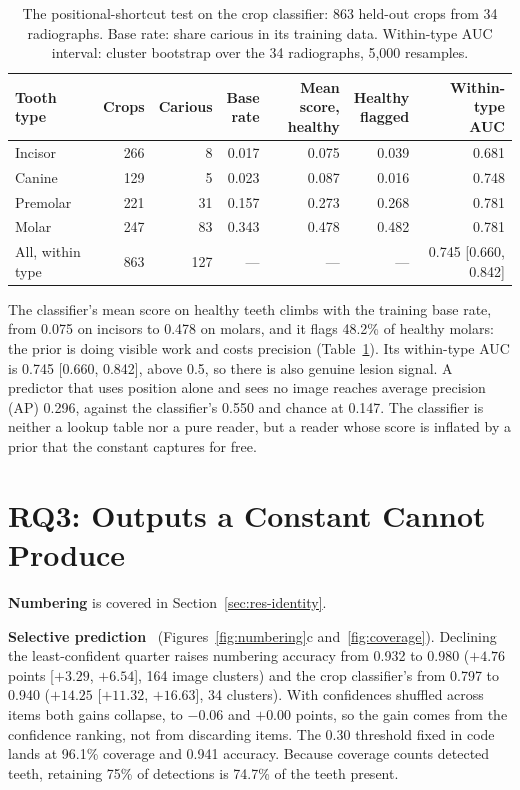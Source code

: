 \begin{table}[!htbp]
\centering
\caption[The positional-shortcut test on the crop classifier]{The positional-shortcut test on the crop
classifier: 863 held-out crops from 34 radiographs. Base rate: share carious in its training data.
Within-type AUC interval: cluster bootstrap over the 34 radiographs, 5,000 resamples.}
\label{tab:shortcut}
\small
\begin{tabular}{@{}lrrrrrr@{}}
\toprule
Tooth type & Crops & Carious & \makecell{Base\\rate} & \makecell{Mean score,\\healthy} & \makecell{Healthy\\flagged} & \makecell{Within-type\\AUC}\\
\midrule
Incisor & 266 & 8 & 0.017 & 0.075 & 0.039 & 0.681\\
Canine & 129 & 5 & 0.023 & 0.087 & 0.016 & 0.748\\
Premolar & 221 & 31 & 0.157 & 0.273 & 0.268 & 0.781\\
Molar & 247 & 83 & 0.343 & 0.478 & 0.482 & 0.781\\
All, within type & 863 & 127 & --- & --- & --- & 0.745 [0.660, 0.842]\\
\bottomrule
\end{tabular}
\end{table}

The classifier's mean score on healthy teeth climbs with the training base rate, from 0.075 on incisors
to 0.478 on molars, and it flags 48.2\% of healthy molars: the prior is doing visible work and costs
precision (Table~\ref{tab:shortcut}). Its within-type AUC is 0.745 [0.660, 0.842], above 0.5, so there
is also genuine lesion signal. A predictor that uses position alone and sees no image reaches
average precision (AP) 0.296, against the classifier's 0.550 and chance at 0.147. The classifier is
neither a lookup table nor a pure reader, but a reader whose score is inflated by a prior that the
constant captures for free. %

\section{RQ3: Outputs a Constant Cannot Produce}
\label{sec:res-rq3}

\textbf{Numbering} is covered in Section~\ref{sec:res-identity}.

\textbf{Selective prediction}~\cite{geifman2017selective} (Figures~\ref{fig:numbering}c
and~\ref{fig:coverage}). Declining the least-confident quarter raises numbering accuracy from 0.932 to
0.980 ($+4.76$ points [$+3.29$, $+6.54$], 164 image clusters) and the crop classifier's from 0.797 to
0.940 ($+14.25$ [$+11.32$, $+16.63$], 34 clusters). With confidences shuffled across items both gains
collapse, to $-0.06$ and $+0.00$ points, so the gain comes from the confidence ranking, not from
discarding items. The 0.30 threshold fixed in code lands at 96.1\% coverage and 0.941 accuracy. Because
coverage counts detected teeth, retaining 75\% of detections is 74.7\% of the teeth present. %


